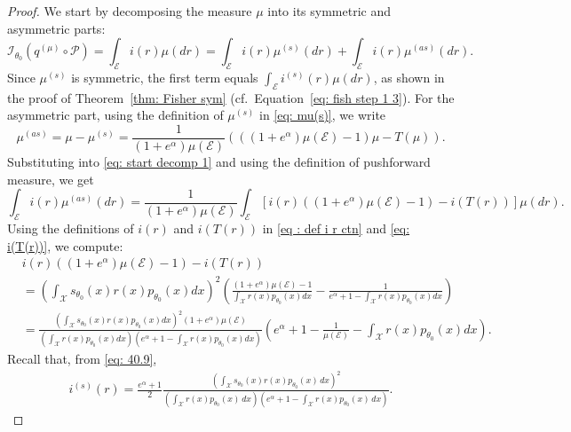 \documentclass[10pt,a4paper]{amsart}
\begin{document}
\begin{proof}
We start by decomposing the measure \( \mu \) into its symmetric and asymmetric parts:
\begin{equation}\label{eq: start decomp 1}
\mathcal{I}_{\theta_0}(q^{(\mu)} \circ \mathcal{P}) = \int_{\mathcal{E}} i(r) \mu(dr) = \int_{\mathcal{E}} i(r) \mu^{(s)}(dr) + \int_{\mathcal{E}} i(r) \mu^{(as)}(dr).
\end{equation}
Since \( \mu^{(s)} \) is symmetric, the first term equals \( \int_{\mathcal{E}} i^{(s)}(r) \mu(dr) \), as shown in the proof of Theorem~\ref{thm: Fisher sym} (cf.~Equation~\eqref{eq: fish step 1 3}). For the asymmetric part, using the definition of \( \mu^{(s)} \) in \eqref{eq: mu(s)}, we write
\[
\mu^{(as)} = \mu - \mu^{(s)} = \frac{1}{(1 + e^\alpha) \mu(\mathcal{E})} \left( ((1 + e^\alpha) \mu(\mathcal{E}) - 1)\mu - T(\mu) \right).
\]
Substituting into \eqref{eq: start decomp 1} and using the definition of pushforward measure, we get
\begin{equation}\label{eq: asym decomp 2}
\int_{\mathcal{E}} i(r) \mu^{(as)}(dr) = \frac{1}{(1 + e^\alpha) \mu(\mathcal{E})} \int_{\mathcal{E}} \left[i(r)((1 + e^\alpha) \mu(\mathcal{E}) - 1) - i(T(r)) \right] \mu(dr).
\end{equation}
Using the definitions of \( i(r) \) and \( i(T(r)) \) in \eqref{eq : def i r ctn} and \eqref{eq: i(T(r))}, we compute:
\begin{align*}
& i(r)((1 + e^\alpha) \mu(\mathcal{E}) - 1) - i(T(r)) \\
&= \left( \int_\mathcal{X} s_{\theta_0}(x) r(x) p_{\theta_0}(x) dx \right)^2 \left( \frac{(1 + e^\alpha) \mu(\mathcal{E}) - 1}{\int_\mathcal{X} r(x) p_{\theta_0}(x) dx} - \frac{1}{e^\alpha + 1 - \int_\mathcal{X} r(x) p_{\theta_0}(x) dx} \right) \\
&= \frac{\left( \int_\mathcal{X} s_{\theta_0}(x) r(x) p_{\theta_0}(x) dx \right)^2 (1 + e^\alpha)\mu(\mathcal{E})}{\left( \int_\mathcal{X} r(x) p_{\theta_0}(x) dx \right)(e^\alpha + 1 - \int_\mathcal{X} r(x) p_{\theta_0}(x) dx)} \left( e^\alpha + 1 - \frac{1}{\mu(\mathcal{E})} - \int_\mathcal{X} r(x) p_{\theta_0}(x) dx \right).
\end{align*}
Recall that, from \eqref{eq: 40.9},
\begin{align*}
i^{(s)}(r) = \frac{e^\alpha + 1}{2} \frac{\left( \int_\mathcal{X} s_{\theta_0}(x) r(x) p_{\theta_0}(x) \, dx \right)^2}{\left( \int_\mathcal{X} r(x) p_{\theta_0}(x) \, dx \right) \left( e^\alpha + 1 - \int_\mathcal{X} r(x) p_{\theta_0}(x) \, dx \right)}.
\end{align*}

\end{proof}
\end{document}
